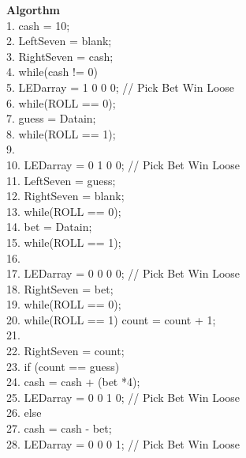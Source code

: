 \begin{description}
        \textbf {Algorthm}
        {\small
            \\
            1. cash = 10; \\
            2. LeftSeven = blank;     \\
            3. RightSeven = cash;     \\
            4. while(cash != 0) {     \\
                5.     LEDarray = 1 0 0 0;    // Pick Bet Win Loose     \\
                6.     while(ROLL == 0);     \\
                7.     guess = Datain;     \\
                8.     while(ROLL == 1);     \\
                9.          \\
                10.     LEDarray = 0 1 0 0;    // Pick Bet Win Loose     \\
                11.     LeftSeven = guess;     \\
                12.     RightSeven = blank;     \\
                13.     while(ROLL == 0);     \\
                14.     bet = Datain;     \\
                15.     while(ROLL == 1);     \\
                16.          \\
                17.     LEDarray = 0 0 0 0;    // Pick Bet Win Loose     \\
                18.     RightSeven = bet;     \\
                19.     while(ROLL == 0);     \\
                20.     while(ROLL == 1) count = count + 1;     \\
                21.      \\
                22.     RightSeven = count;     \\
                23.     if (count == guess) {     \\
                    24.         cash = cash + (bet *4);     \\
                    25.         LEDarray = 0 0 1 0;    // Pick Bet Win Loose     \\
                26.     } else {     \\
                    27.         cash = cash - bet;     \\
                    28.         LEDarray = 0 0 0 1;    // Pick Bet Win Loose     \\
}}}
\end{description}
